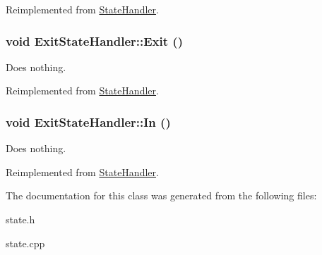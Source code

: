 Reimplemented from \hyperlink{classStateHandler_c08036e743cf5172d6931cf3b6d321c6}{StateHandler}.\hypertarget{classExitStateHandler_0d6c713864949be9525cffb4522bb996}{
\subsubsection[{Exit}]{\setlength{\rightskip}{0pt plus 5cm}void ExitStateHandler::Exit ()}}
\label{classExitStateHandler_0d6c713864949be9525cffb4522bb996}


Does nothing. 



Reimplemented from \hyperlink{classStateHandler_5ce0f2cb3d4a9f5aca137d47eac75c1e}{StateHandler}.\hypertarget{classExitStateHandler_b925619b8046b31d86795eaee6977aa0}{
\subsubsection[{In}]{\setlength{\rightskip}{0pt plus 5cm}void ExitStateHandler::In ()}}
\label{classExitStateHandler_b925619b8046b31d86795eaee6977aa0}


Does nothing. 



Reimplemented from \hyperlink{classStateHandler_cee16f855e7354d21abafa47acd1046c}{StateHandler}.

The documentation for this class was generated from the following files:\begin{CompactItemize}
\item 
state.h\item 
state.cpp\end{CompactItemize}

